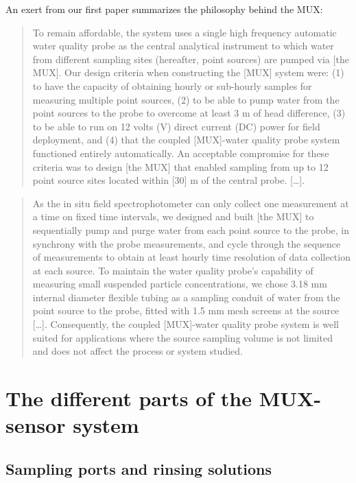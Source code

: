 \documentclass[]{book}
\begin{document}
An exert from our first paper \citep{Birgand2016-to} summarizes the philosophy behind the MUX:

\begin{quote}
To remain affordable, the system uses a single high frequency automatic water quality probe as the central analytical
instrument to which water from different sampling sites (hereafter, point sources) are pumped via {[}the MUX{]}. Our design criteria when constructing the {[}MUX{]} system were: (1) to have the capacity of obtaining hourly or sub-hourly samples for measuring multiple point sources, (2) to be able to pump water from the point sources to the probe to overcome at least 3 m of head difference, (3) to be able to run on 12 volts (V) direct current (DC) power for field deployment, and (4) that the coupled {[}MUX{]}-water quality probe system functioned entirely automatically. An acceptable compromise for these criteria was to design {[}the MUX{]} that enabled sampling from up to 12 point source sites located within {[}30{]} m of the central probe. {[}\ldots{}{]}.
\end{quote}

\begin{quote}
As the in situ field spectrophotometer can only collect one measurement at a time on fixed time intervals, we designed and built {[}the MUX{]} to sequentially pump and purge water from each point source to the probe, in synchrony with the probe measurements, and cycle through the sequence of measurements to obtain at least hourly time resolution of data collection at each source. To maintain the water quality probe's capability of measuring small suspended particle concentrations, we chose 3.18 mm internal diameter flexible tubing as a sampling conduit of water from the point source to the probe, fitted with 1.5 mm mesh screens at the source {[}\ldots{}{]}. Consequently, the coupled {[}MUX{]}-water quality probe system is well suited for applications where the source sampling volume is not limited and does not affect the process or system studied.
\end{quote}

\hypertarget{the-different-parts-of-the-mux-sensor-system}{%
\section{The different parts of the MUX-sensor system}\label{the-different-parts-of-the-mux-sensor-system}}

\hypertarget{sampling-ports-and-rinsing-solutions}{%
\subsection{Sampling ports and rinsing solutions}\label{sampling-ports-and-rinsing-solutions}}
\end{document}
